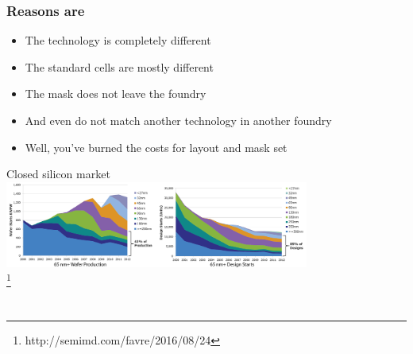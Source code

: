 \documentclass{beamer}
\begin{document}
\begin{frame}
\frametitle{Reasons are}
	\begin{itemize}
		\item The technology is completely different
		\item The standard cells are mostly different
		\item The mask does not leave the foundry
		\item And even do not match another technology in another foundry
		\item Well, you've burned the costs for layout and mask set
	\end{itemize}
\end{frame}

\begin{frame}{Closed silicon market}
	\centering
	\hspace*{-0.3in}
	\includegraphics[width=0.75\textwidth]{market-closing.png} \\
	\footnote{http://semimd.com/favre/2016/08/24}
\end{frame}



\section[How]{}
\end{document}
